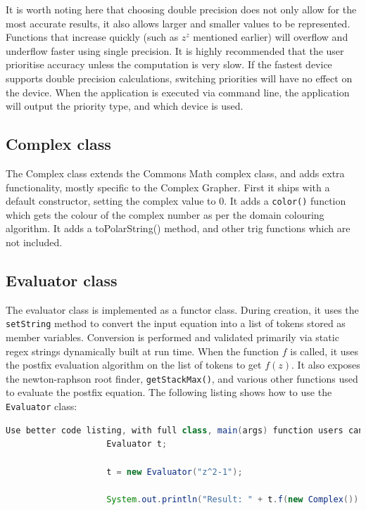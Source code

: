 \documentclass{article}
\begin{document}
		It is worth noting here that choosing double precision does not only allow for the most accurate results, it also allows larger and smaller values to be represented. Functions that increase quickly (such as $z^z$ mentioned earlier) will overflow and underflow faster using single precision. It is highly recommended that the user prioritise accuracy unless the computation is very slow. If the fastest device supports double precision calculations, switching priorities will have no effect on the device. When the application is executed via command line, the application will output the priority type, and which device is used.
		
			\subsection{Complex class}
				The Complex class extends the Commons Math complex class, and adds extra functionality, mostly specific to the Complex Grapher. First it ships with a default constructor, setting the complex value to 0. It adds a \lstinline{color()} function which gets the colour of the complex number as per the domain colouring algorithm. It adds a toPolarString() method, and other trig functions which are not included.
		
			\subsection{Evaluator class}
				The evaluator class is implemented as a functor class. During creation, it uses the \lstinline{setString} method to convert the input equation into a list of tokens stored as member variables. Conversion is performed and validated primarily via static regex strings dynamically built at run time. When the function $f$ is called, it uses the postfix evaluation algorithm on the list of tokens to get $f(z)$. It also exposes the newton-raphson root finder, \lstinline{getStackMax()}, and various other functions used to evaluate the postfix equation. The following listing shows how to use the \lstinline{Evaluator} class:
				
				\begin{lstlisting}[language=Java]
					Use better code listing, with full class, main(args) function users can copy and paste to work without editing
					Evaluator t;
					
					t = new Evaluator("z^2-1");
					
					System.out.println("Result: " + t.f(new Complex()).toString());
				\end{lstlisting}
			
\end{document}
